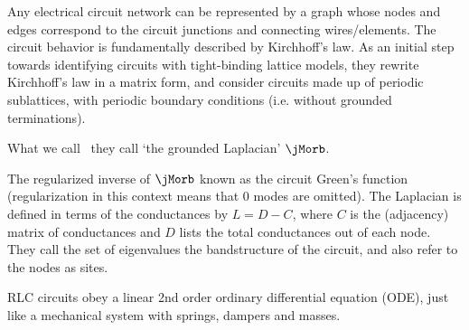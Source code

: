 \begin{description}
Any electrical circuit network can be represented by a graph whose nodes
and edges correspond to the circuit junctions and connecting
wires/elements. The circuit behavior is fundamentally described by
Kirchhoff's law. As an initial step towards identifying circuits with
tight-binding lattice models, they rewrite Kirchhoff's law in a matrix
form, and consider circuits made up of periodic sublattices, with
periodic boundary conditions (i.e. without grounded terminations).

What we call {\jacobianOrb} \jMorb\ they call `the grounded Laplacian'
$\jMorb$.

The regularized inverse of $\jMorb$ known as the circuit Green's function
(regularization in this context means that 0 modes are omitted).
The Laplacian is defined in terms of the conductances by $L=D-C$,
where $C$ is the (adjacency) matrix of conductances and
$D$ lists the total conductances out of each node.
They call the set of eigenvalues the bandstructure of the circuit, and
also refer to the nodes as sites.

RLC circuits obey a linear 2nd order ordinary differential equation
(ODE), just like a mechanical system with springs, dampers and masses.






\end{description}

\renewcommand\speriod[1]{{\ensuremath{L_{#1}}}}  %
\renewcommand\period[1]{{\ensuremath{T_{#1}}}}  %
